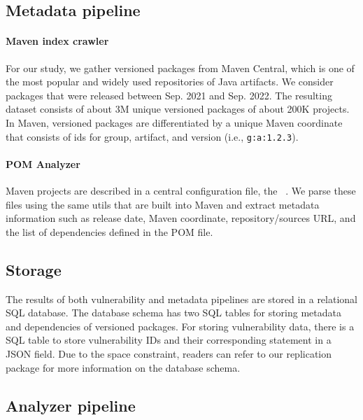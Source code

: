 \subsection{Metadata pipeline}
\paragraph{Maven index crawler}\label{ch3:subsec:dataset}
For our study, we gather versioned packages from Maven Central, which is one of the most popular and widely used repositories of Java artifacts.
We consider packages that were released between Sep. 2021 and Sep. 2022.
The resulting dataset consists of about 3M unique versioned packages of about 200K projects.
In Maven, versioned packages are differentiated by a unique Maven coordinate that consists of ids for group, artifact, and version (i.e., \texttt{g:a:1.2.3}).

\paragraph{POM Analyzer}
Maven projects are described in a central configuration file, the ~\cite{mvnpom}.
We parse these files using the same utils that are built into Maven and extract metadata information such as release date, Maven coordinate, repository/sources URL, and the list of dependencies defined in the POM file.

\subsection{Storage}\label{ch3:subsec:storage}
The results of both vulnerability and metadata pipelines are stored in a relational SQL database. The database schema has two SQL tables for storing metadata and dependencies of versioned packages. For storing vulnerability data, there is a SQL table to store vulnerability IDs and their corresponding statement in a JSON field. Due to the space constraint, readers can refer to our replication package for more information on the database schema.

\subsection{Analyzer pipeline}
